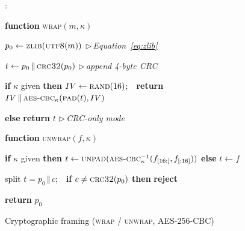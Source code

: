 \documentclass[10pt,a4paper]{article}
\theoremstyle{definition}
\newcounter{algln}
\begin{document}
\begin{figure}[t]\captionsetup{type=algorithm}
\caption{Cryptographic framing (\textsc{wrap} / \textsc{unwrap}, AES-256-CBC)}\label{alg:wrap}
\begin{list}{\footnotesize{}:}{%
    \setlength{\leftmargin}{2.4em}\setlength{\labelwidth}{1.7em}%
    \setlength{\labelsep}{0.4em}\setlength{\itemsep}{1.5pt}%
    \setlength{\parsep}{0pt}\setlength{\topsep}{3pt}\small}
\item \textbf{function} \textsc{wrap}$(m,\kappa)$
\item \hspace*{1.3em} $p_0 \gets \textsc{zlib}(\textsc{utf8}(m))$ \hfill{\footnotesize$\triangleright$\,\textit{Equation~\eqref{eq:zlib}}}
\item \hspace*{1.3em} $t \gets p_0 \,\Vert\, \textsc{crc32}(p_0)$ \hfill{\footnotesize$\triangleright$\,\textit{append 4-byte CRC}}
\item \hspace*{1.3em} \textbf{if} $\kappa$ given \textbf{then} $IV\gets\textsc{rand}(16)$;\ \ \textbf{return} $IV \,\Vert\, \textsc{aes-cbc}_\kappa(\textsc{pad}(t),IV)$
\item \hspace*{1.3em} \textbf{else} \textbf{return} $t$ \hfill{\footnotesize$\triangleright$\,\textit{CRC-only mode}}
\item \textbf{function} \textsc{unwrap}$(f,\kappa)$
\item \hspace*{1.3em} \textbf{if} $\kappa$ given \textbf{then} $t\gets\textsc{unpad}(\textsc{aes-cbc}^{-1}_\kappa(f_{[16:]},f_{[:16]}))$ \textbf{else} $t\gets f$
\item \hspace*{1.3em} split $t=p_0\,\Vert\, c$;\ \ \textbf{if} $c\neq\textsc{crc32}(p_0)$ \textbf{then} \textbf{reject}
\item \hspace*{1.3em} \textbf{return} $p_0$
\end{list}
\end{figure}
\end{document}
